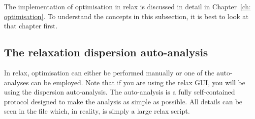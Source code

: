 The implementation of optimisation in relax is discussed in detail in Chapter~\ref{ch: optimisation}.
To understand the concepts in this subsection, it is best to look at that chapter first.



\subsection{The relaxation dispersion auto-analysis}

In relax, optimisation can either be performed manually or one of the auto-analyses can be employed.
Note that if you are using the relax GUI, you will be using the dispersion auto-analysis.
The auto-analysis is a fully self-contained protocol designed to make the analysis as simple as possible.
All details can be seen in the  file which, in reality, is simply a large relax script.


